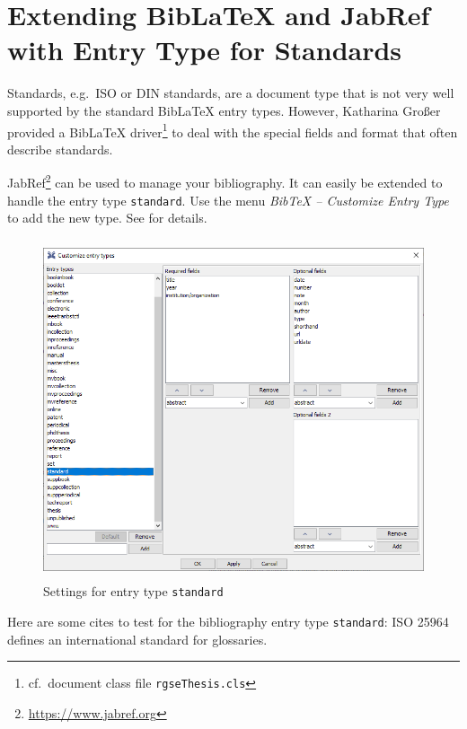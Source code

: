 
\chapter{Extending BibLaTeX and JabRef with Entry Type for Standards}

Standards, e.g.\ ISO or DIN standards, are a document type that is not very well supported by the standard BibLaTeX entry types. However, Katharina Großer provided a BibLaTeX driver\footnote{cf.\ document class file \texttt{rgseThesis.cls}} to deal with the special fields and format that often describe standards.

JabRef\footnote{\url{https://www.jabref.org}} can be used to manage your bibliography. It can easily be extended to handle the entry type \texttt{standard}. Use the menu \emph{BibTeX -- Customize Entry Type} to add the new type. See  for details.

\begin{figure}
    \centering
    \includegraphics[height=10cm]{images/JabRef}
    \caption{Settings for entry type \texttt{standard}\label{fig:jabref}}
\end{figure}

Here are some cites to test for the bibliography entry type \texttt{standard}: ISO 25964 \cite{ISO20111TI, ISO20132IO} defines an international standard for glossaries.

\cleardoublepage
